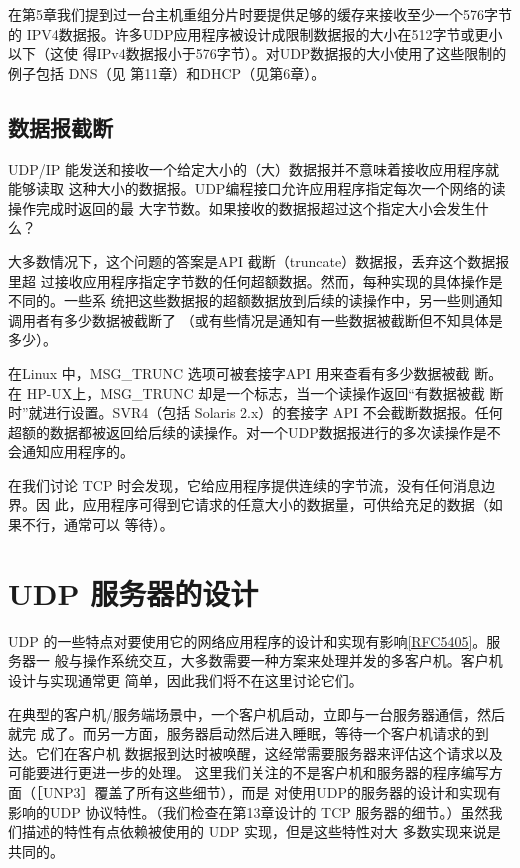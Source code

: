 在第5章我们提到过一台主机重组分片时要提供足够的缓存来接收至少一个576字节的
IPV4数据报。许多UDP应用程序被设计成限制数据报的大小在512字节或更小以下（这使
得IPv4数据报小于576字节）。对UDP数据报的大小使用了这些限制的例子包括 DNS（见
第11章）和DHCP（见第6章）。

\subsection{数据报截断}
UDP/IP 能发送和接收一个给定大小的（大）数据报并不意味着接收应用程序就能够读取
这种大小的数据报。UDP编程接口允许应用程序指定每次一个网络的读操作完成时返回的最
大字节数。如果接收的数据报超过这个指定大小会发生什么？

大多数情况下，这个问题的答案是API 截断（truncate）数据报，丢弃这个数据报里超
过接收应用程序指定字节数的任何超额数据。然而，每种实现的具体操作是不同的。一些系
统把这些数据报的超额数据放到后续的读操作中，另一些则通知调用者有多少数据被截断了
（或有些情况是通知有一些数据被截断但不知具体是多少）。

\begin{tcolorbox}    
    在Linux 中，MSG\_TRUNC 选项可被套接字API 用来查看有多少数据被截
    断。在 HP-UX上，MSG\_TRUNC 却是一个标志，当一个读操作返回“有数据被截
    断时”就进行设置。SVR4（包括 Solaris 2.x）的套接字 API 不会截断数据报。任何
    超额的数据都被返回给后续的读操作。对一个UDP数据报进行的多次读操作是不
    会通知应用程序的。
\end{tcolorbox}

在我们讨论 TCP 时会发现，它给应用程序提供连续的字节流，没有任何消息边界。因
此，应用程序可得到它请求的任意大小的数据量，可供给充足的数据（如果不行，通常可以
等待）。

\section{UDP 服务器的设计}
UDP 的一些特点对要使用它的网络应用程序的设计和实现有影响\href{https://www.rfc-editor.org/rfc/rfc5405}{[RFC5405]}。服务器一
般与操作系统交互，大多数需要一种方案来处理并发的多客户机。客户机设计与实现通常更
简单，因此我们将不在这里讨论它们。

在典型的客户机/服务端场景中，一个客户机启动，立即与一台服务器通信，然后就完
成了。而另一方面，服务器启动然后进入睡眠，等待一个客户机请求的到达。它们在客户机
数据报到达时被唤醒，这经常需要服务器来评估这个请求以及可能要进行更进一步的处理。
这里我们关注的不是客户机和服务器的程序编写方面（［UNP3］覆盖了所有这些细节），而是
对使用UDP的服务器的设计和实现有影响的UDP 协议特性。（我们检查在第13章设计的
TCP 服务器的细节。）虽然我们描述的特性有点依赖被使用的 UDP 实现，但是这些特性对大
多数实现来说是共同的。

